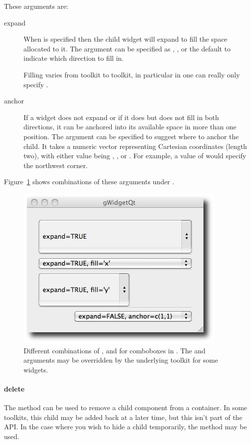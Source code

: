 These arguments are:
\begin{description}
\item[expand] When  is specified then the child
  widget will expand to fill the space allocated to it. The
   argument can be specified as , , or
  the default  to indicate which direction to fill
  in. 
  
  Filling varies from toolkit to toolkit, in particular
  in  one can really only specify .
  
\item[anchor] If a widget does not expand or if it does but does not fill in both
  directions, it can be anchored into its available space in more than
  one position. The  argument can be specified to suggest
  where to anchor the child. It takes a numeric vector representing
  Cartesian coordinates (length two),
  with either value being , , or . For
  example, a value of  would specify the northwest corner.
\end{description}

Figure~\ref{fig:gWidgets-ggroup-expand-fill-anchor} shows combinations
of these arguments under .


\begin{figure}
  \centering
  \includegraphics[width=.5\textwidth]{fig-gWidgets-ggroup-expand-fill-anchor}
  \caption{Different combinations of ,  and
     for comboboxes in . The 
    and  arguments
    may be overridden by the underlying toolkit for some widgets.}
  \label{fig:gWidgets-ggroup-expand-fill-anchor}
\end{figure}


\paragraph{delete}
The  method can be used to remove a child
component from a container. In some toolkits, this child may be
added back at a later time, but this isn't part of the API. In the
case where you wish to hide a child temporarily, the
 method may be used.





